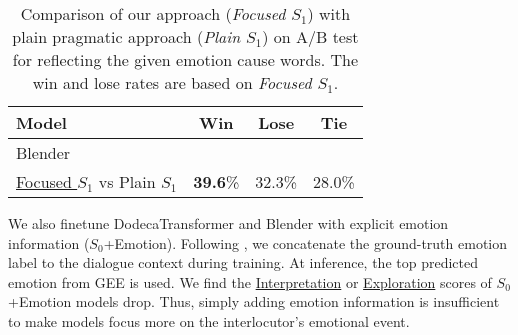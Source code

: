 \documentclass[11pt]{article}
\begin{document}
{\renewcommand{\arraystretch}{1.1}\begin{table}[t!] \begin{center}
    \small
    \setlength{\tabcolsep}{7.7pt}
    \begin{tabular}{lccc}
        \toprule
        \hspace{-2mm}Model                                 & Win             & Lose          & Tie    \\
        \midrule
        \multicolumn{4}{l}{\hspace{-2mm}Blender \citep{Roller:2021:EACL}} \\
        \addlinespace[0.1cm]
        \underline{Focused $S_1$} vs Plain $S_1$    & \textbf{39.6}\%            & 32.3\%          & 28.0\%                     \\
        \bottomrule
    \end{tabular}
    \vspace{-2pt}
    \caption{
        Comparison of our approach (\textit{Focused $S_1$}) with plain pragmatic approach (\textit{Plain $S_1$}) on A/B test for reflecting the given emotion cause words.
        The win and lose rates are based on \textit{Focused $S_1$}.
    }
    \vspace{-10pt}
    \label{tab:amt_ab_test_focused}
\end{center}\end{table}}


We also finetune DodecaTransformer and Blender with explicit emotion information ($S_0$+Emotion).
Following \citet{Rashkin:2019:ACL}, we concatenate the ground-truth emotion label to the dialogue context during training.
At inference, the top predicted emotion from GEE is used.
We find the \underline{Interpretation} or \underline{Exploration} scores of $S_0$+Emotion models drop.
Thus, simply adding emotion information is insufficient to make models focus more on the interlocutor's emotional event.
\end{document}

